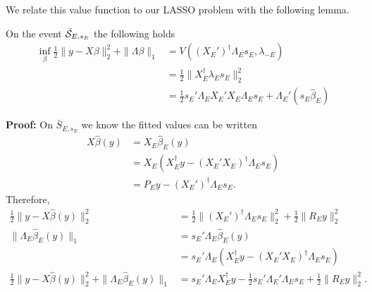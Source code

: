 \documentclass{article}
\newcommand{\REG}{\hat{\beta}}
\begin{document}
        We relate this value function to our LASSO problem with the following lemma.
        \begin{lemma}
          On the event $\bar{\cal S}_{E,s_E}$ the following holds
          \begin{equation}
            \begin{aligned}
            \label{eq:lasso:value}
            \inf_{\beta} \frac{1}{2} \|y-X\beta\|^2_2 +  \|\Lambda \beta\|_1 &= V((X_E')^{\dagger}\Lambda_Es_E, \lambda_{-E}) \\
            &= \frac{1}{2} \|X_E^{\dagger}\lambda_Es_E\|^2_2 \\
            &= \frac{1}{2} s_E'\Lambda_EX_E'X_E\Lambda_Es_E + \Lambda_E'(s_E\hat{\beta}_E)
            \end{aligned}
          \end{equation}
        \end{lemma}

        {\bf Proof:} On $\bar{S}_{E,s_E}$ we know the fitted values can be written
        $$
        \begin{aligned}
          X\REG(y) &= X_E\REG_E(y) \\
          &= X_E(X_E^{\dagger}y - (X_E'X_E)^{\dagger}\Lambda_Es_E) \\
          &= P_Ey - (X_E')^{\dagger}\Lambda_Es_E.
        \end{aligned}
        $$
        Therefore,
        $$
        \begin{aligned}
          \frac{1}{2} \|y-X\REG(y)\|^2_2 &= \frac{1}{2}\|(X_E')^{\dagger}\Lambda_Es_E\|^2_2 + \frac{1}{2} \|R_Ey\|^2_2 \\
          \|\Lambda_E\REG_E(y)\|_1 &= s_E'\Lambda_E\REG_E(y) \\
          &= s_E'\Lambda_E(X_E^{\dagger}y - (X_E'X_E)^{\dagger}\Lambda_Es_E) \\
          \frac{1}{2} \|y-X\REG(y)\|^2_2+\|\Lambda_E\REG_E(y)\|_1
          &= s_E'\Lambda_EX_E^{\dagger}y - \frac{1}{2} s_E'\Lambda_E'\Lambda_E s_E  + \frac{1}{2}\|R_Ey\|^2_2.
          \end{aligned}
        $$
        
\end{document}
